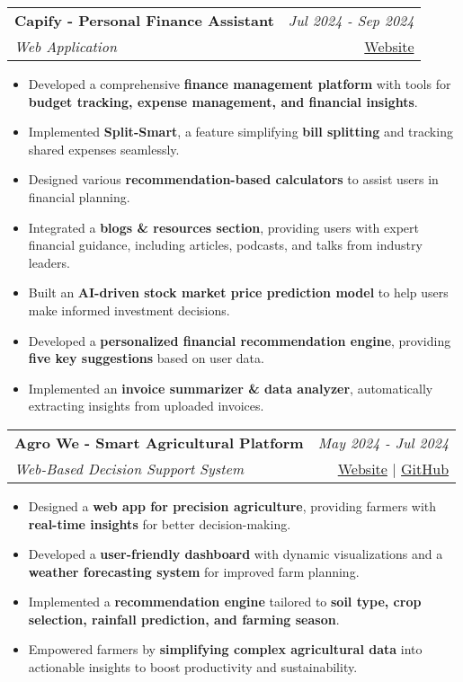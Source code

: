 \documentclass[a4paper,11pt]{article}
\makeatletter
\newcommand{\resumeProject}[4]{
\vspace{0.5mm}\item
    \begin{tabular*}{0.98\textwidth}[t]{l@{\extracolsep{\fill}}r}
        \textbf{#1} & \textit{\footnotesize{#3}} \\
        \footnotesize{\textit{#2}} & \footnotesize{#4}
    \end{tabular*}
    \vspace{-2.4mm}
}
\newcommand{\resumeItemListStart}{\begin{itemize}[leftmargin=*,labelsep=1mm,itemsep=0.5mm]}
\newcommand{\resumeItemListEnd}{\end{itemize}\vspace{-2mm}}
\makeatother
\begin{document}
\resumeProject
    {Capify - Personal Finance Assistant}
    {Web Application}
    {Jul 2024 - Sep 2024}
    {{}\href{https://capify.vercel.app/}{Website}}
\resumeItemListStart
    \item Developed a comprehensive \textbf{finance management platform} with tools for \textbf{budget tracking, expense management, and financial insights}.
    \item Implemented \textbf{Split-Smart}, a feature simplifying \textbf{bill splitting} and tracking shared expenses seamlessly.
    \item Designed various \textbf{recommendation-based calculators} to assist users in financial planning.
    \item Integrated a \textbf{blogs \& resources section}, providing users with expert financial guidance, including articles, podcasts, and talks from industry leaders.
    \item Built an \textbf{AI-driven stock market price prediction model} to help users make informed investment decisions.
    \item Developed a \textbf{personalized financial recommendation engine}, providing \textbf{five key suggestions} based on user data.
    \item Implemented an \textbf{invoice summarizer \& data analyzer}, automatically extracting insights from uploaded invoices.
\resumeItemListEnd

\resumeProject
    {Agro We - Smart Agricultural Platform}
    {Web-Based Decision Support System}
    {May 2024 - Jul 2024}
    {{}\href{https://agrowe-the-deepdas-projects.vercel.app/}{Website} | \href{https://github.com/THE-DEEPDAS/Agro-We}{GitHub}}
    
\resumeItemListStart
    \item Designed a \textbf{web app for precision agriculture}, providing farmers with \textbf{real-time insights} for better decision-making.
    \item Developed a \textbf{user-friendly dashboard} with dynamic visualizations and a \textbf{weather forecasting system} for improved farm planning.
    \item Implemented a \textbf{recommendation engine} tailored to \textbf{soil type, crop selection, rainfall prediction, and farming season}.
    \item Empowered farmers by \textbf{simplifying complex agricultural data} into actionable insights to boost productivity and sustainability.
\resumeItemListEnd
\end{document}
